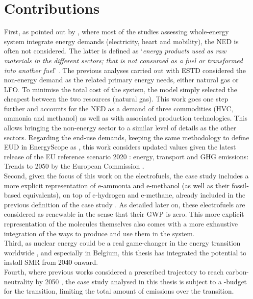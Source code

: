 \section{Contributions}
\label{sec:cs:contributions}
First, as pointed out by \citet{rixhon2022integration}, where most of the studies assessing whole-energy system integrate energy demands (\ie electricity, heart and mobility), the \gls{NED} is often not considered. The latter is defined as ‘\textit{energy products used as raw materials in the different sectors; that is not consumed as a fuel or transformed into another fuel}’ \cite{Eurostat2019}. The previous analyses carried out with \gls{ESTD} considered the non-energy demand as the related primary energy needs, \ie either natural gas or \gls{LFO}. To minimise the total cost of the system, the model simply selected the cheapest between the two resources (\ie natural gas). This work goes one step further and accounts for the \gls{NED} as a demand of three commodities (\ie \gls{HVC}, ammonia and methanol) as well as with associated production technologies. This allows bringing the non-energy sector to a similar level of details as the other sectors.  Regarding the end-use demands,  keeping the same methodology to define \gls{EUD} in EnergyScope as \citet{Limpens2020}, this work considers updated values given the latest release of the \og EU reference scenario 2020 : energy, transport and GHG emissions: Trends to 2050 \fg by the European Commission \cite{EuropeanCommission2021}.\\

Second, given the focus of this work on the electrofuels, the case study includes a more explicit representation of e-ammonia and e-methanol (as well as their fossil-based equivalents), on top of e-hydrogen and e-methane, already included in the previous definition of the case study \cite{limpens2021generating}. As detailed later on, these electrofuels are considered as renewable in the sense that their \gls{GWP} is zero. This more explicit representation of the molecules themselves also comes with a more exhaustive integration of the ways to produce and use them in the system.\\

Third, as nuclear energy could be a real game-changer in the energy transition worldwide \cite{IEA2022nuclear}, and especially in Belgium, this thesis has integrated the potential to install \gls{SMR} from 2040 onward.\\

Fourth, where previous works considered a prescribed  trajectory to reach carbon-neutrality by 2050 \cite{limpens2021generating, limpens2024pathway}, the case study analysed in this thesis is subject to a -budget for the transition, \ie limiting the total amount of emissions over the transition.\\

